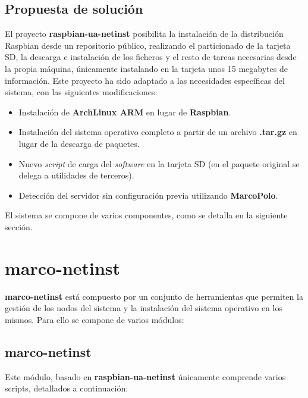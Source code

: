 \documentclass{article}
\begin{document}
\subsection{Propuesta de solución}

El proyecto \textbf{raspbian-ua-netinst}\cite{raspbian-ua-netinst} posibilita la instalación de la distribución Raspbian desde un repositorio público, realizando el particionado de la tarjeta SD, la descarga e instalación de los ficheros y el resto de tareas necesarias desde la propia máquina, únicamente instalando en la tarjeta unos 15 megabytes de información. Este proyecto ha sido adaptado a las necesidades específicas del sistema, con las siguientes modificaciones:

\begin{itemize}
	\item Instalación de \textbf{ArchLinux ARM} en lugar de \textbf{Raspbian}.
	\item Instalación del sistema operativo completo a partir de un archivo \textbf{.tar.gz} en lugar de la descarga de paquetes.
	\item Nuevo \textit{script} de carga del \textit{software} en la tarjeta SD (en el paquete original se delega a utilidades de terceros).
	\item Detección del servidor sin configuración previa utilizando \textbf{MarcoPolo}.
\end{itemize}

El sistema se compone de varios componentes, como se detalla en la siguiente sección.

\section{marco-netinst}

\textbf{marco-netinst} está compuesto por un conjunto de herramientas que permiten la gestión de los nodos del sistema y la instalación del sistema operativo en los mismos. Para ello se compone de varios módulos:

\subsection{marco-netinst}

Este módulo, basado en \textbf{raspbian-ua-netinst} únicamente comprende varios scripts, detallados a continuación:
\end{document}
